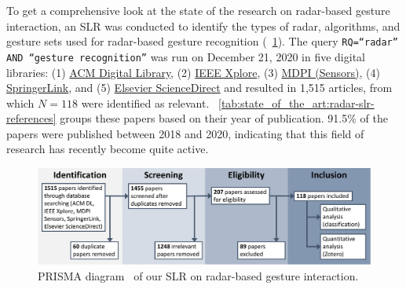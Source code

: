 To get a comprehensive look at the state of the research on radar-based gesture interaction, an SLR was conducted to identify the types of radar, algorithms, and gesture sets used for radar-based gesture recognition (\fig~\ref{fig:state_of_the_art:radar:prisma}). The query \texttt{RQ=``radar'' AND ``gesture recognition''} was run on December 21, 2020 in five digital libraries: (1) \href{https://dl.acm.org/}{ACM Digital Library}, (2) \href{https://ieeexplore.ieee.org/Xplore/home.jsp}{IEEE Xplore}, (3) \href{https://www.mdpi.com/journal/sensors}{MDPI (Sensors)}, (4) \href{https://link.springer.com/}{SpringerLink}, and (5) \href{https://www.sciencedirect.com/}{Elsevier ScienceDirect} and resulted in 1,515 articles, from which $N=118$ were identified as relevant. \tab~\ref{tab:state_of_the_art:radar-slr-references} groups these papers based on their year of publication. 91.5\% of the papers were published between 2018 and 2020, indicating that this field of research has recently become quite active. 

\begin{figure}[hbt]
    \centering
    \includegraphics[width=\linewidth]{Figures/StateOfTheArt/Radar/PRISMA-Radar.pdf}
    \caption{PRISMA diagram~\cite{Page:2021} of our SLR on radar-based gesture interaction.}
    \label{fig:state_of_the_art:radar:prisma}
\end{figure}

